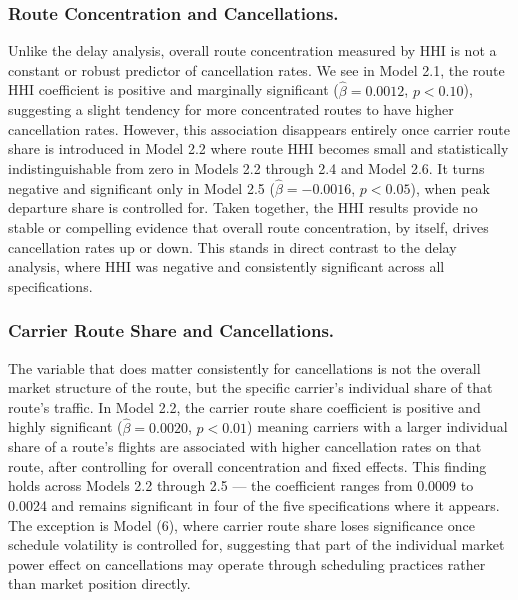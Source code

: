 \documentclass[preprint,12pt,authoryear]{elsarticle}
\begin{document}
\subsubsection{Route Concentration and Cancellations.}
Unlike the delay analysis, overall route concentration measured by HHI is not a constant or robust predictor of cancellation rates. We see in Model 2.1, the route HHI coefficient is positive and marginally significant ($\hat{\beta} = 0.0012$, $p < 0.10$), suggesting a slight tendency for more concentrated routes to have higher cancellation rates. However, this association disappears entirely once carrier route share is introduced in Model 2.2 where route HHI becomes small and statistically indistinguishable from zero in Models 2.2 through 2.4 and Model 2.6. It turns negative and significant only in Model 2.5 ($\hat{\beta} = -0.0016$, $p < 0.05$), when peak departure share is controlled for. Taken together, the HHI results provide no stable or compelling evidence that overall route concentration, by itself, drives cancellation rates up or down. This stands in direct contrast to the delay analysis, where HHI was negative and consistently significant across all specifications.

\subsubsection{Carrier Route Share and Cancellations.}
The variable that does matter consistently for cancellations is not the overall market structure of the route, but the specific carrier's individual share of that route's traffic. In Model 2.2, the carrier route share coefficient is positive and highly significant ($\hat{\beta} = 0.0020$, $p < 0.01$) meaning carriers with a larger individual share of a route's flights are associated with higher cancellation rates on that route, after controlling for overall concentration and fixed effects. This finding holds across Models 2.2 through 2.5 — the coefficient ranges from 0.0009 to 0.0024 and remains significant in four of the five specifications where it appears. The exception is Model (6), where carrier route share loses significance once schedule volatility is controlled for, suggesting that part of the individual market power effect on cancellations may operate through scheduling practices rather than market position directly.
\end{document}
